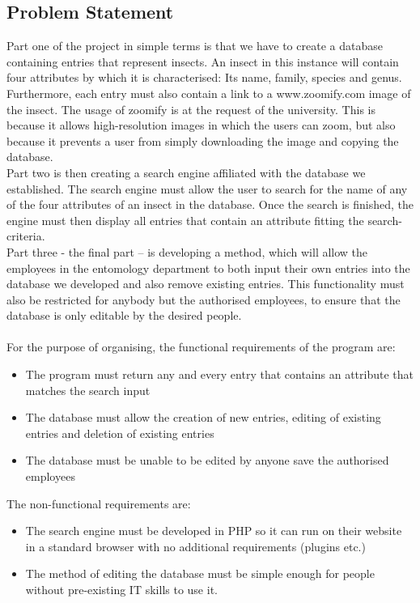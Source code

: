 \documentclass[12pt,a4paper]{article}
\begin{document}
\subsection{Problem Statement}
Part one of the project in simple terms is that we have to create a database containing entries that represent insects. An insect in this instance will contain four attributes by which it is characterised: Its name, family, species and genus. Furthermore, each entry must also contain a link to a www.zoomify.com image of the insect. The usage of zoomify is at the request of the university. This is because it allows high-resolution images in which the users can zoom, but also because it prevents a user from simply downloading the image and copying the database. \\
Part two is then creating a search engine affiliated with the database we established. The search engine must allow the user to search for the name of any of the four attributes of an insect in the database. Once the search is finished, the engine must then display all entries that contain an attribute fitting the search-criteria.\\
Part three - the final part – is developing a method, which will allow the employees in the entomology department to both input their own entries into the database we developed and also remove existing entries. This functionality must also be restricted for anybody but the authorised employees, to ensure that the database is only editable by the desired people.\\\\
For the purpose of organising, the functional requirements of the program are:
\begin{itemize}
	\item The program must return any and every entry that contains an attribute that matches the search input
	\item The database must allow the creation of new entries, editing of existing entries and deletion of existing entries
	\item The database must be unable to be edited by anyone save the authorised employees
\end{itemize}
	The non-functional requirements are:\\
\begin{itemize}
	\item The search engine must be developed in PHP so it can run on their website in a standard browser with no additional requirements (plugins etc.)
	\item The method of editing the database must be simple enough for people without pre-existing IT skills to use it.
\end{itemize}
\end{document}
